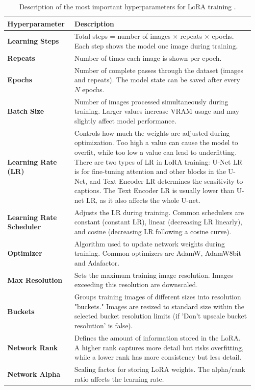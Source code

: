 \begin{table}[h]
        \caption{Description of the most important hyperparameters for LoRA training \cite{kohya-lora-training}.}
    \label{tab:explanationloraparams}
    \centering
    \begin{tabular}{|p{}|p{}|}
    \hline
    \textbf{Hyperparameter} &  \textbf{Description}  \\ \hline
    \textbf{Learning Steps} & Total steps = number of images × repeats × epochs. Each step shows the model one image during training. \\ \hline
    \textbf{Repeats} & Number of times each image is shown per epoch. \\ \hline
    \textbf{Epochs} & Number of complete passes through the dataset (images and repeats). The model state can be saved after every $N$ epochs. \\ \hline
    \textbf{Batch Size} & Number of images processed simultaneously during training. Larger values increase VRAM usage and may slightly affect model performance. \\ \hline
    \textbf{Learning Rate (LR)} & Controls how much the weights are adjusted during optimization. Too high a value can cause the model to overfit, while too low a value can lead to underfitting. There are two types of LR in LoRA training: U-Net LR is for fine-tuning attention and other blocks in the U-Net, and Text Encoder LR determines the sensitivity to captions. The Text Encoder LR is usually lower than U-net LR, as it also affects the whole U-net. \\ \hline
    \textbf{Learning Rate Scheduler} & Adjusts the LR during training. Common schedulers are constant (constant LR), linear (decreasing LR linearly), and cosine (decreasing LR following a cosine curve).  \\ \hline
    \textbf{Optimizer} & Algorithm used to update network weights during training. Common optimizers are AdamW, AdamW8bit and Adafactor. \\ \hline
    \textbf{Max Resolution} & Sets the maximum training image resolution. Images exceeding this resolution are downscaled. \\ \hline
    \textbf{Buckets} & Groups training images of different sizes into resolution "buckets." Images are resized to standard size within the selected bucket resolution limits (if 'Don't upscale bucket resolution' is false). \\ \hline
    \textbf{Network Rank} & Defines the amount of information stored in the LoRA. A higher rank captures more detail but risks overfitting, while a lower rank has more consistency but less detail.  \\ \hline
    \textbf{Network Alpha} & Scaling factor for storing LoRA weights. The alpha/rank ratio affects the learning rate. \\ \hline
    \end{tabular}
    \end{table}

